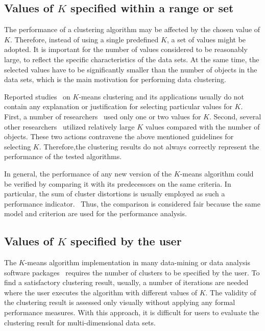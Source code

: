 \subsection{Values of $K$ specified within a range or set}
The  performance  of  a  clustering  algorithm  may  be
affected by the chosen value of $K$. Therefore, instead
of using a single predefined $K$, a set of values might
be   adopted.   It   is   important   for   the   number   of
values  considered  to  be  reasonably  large,  to  reflect
the  specific  characteristics  of  the  data  sets.  At  the
same  time,  the  selected  values  have  to  be  significantly
smaller  than  the  number  of  objects  in  the
data sets, which is the main motivation for performing data clustering.

Reported studies~\cite{han00, daoud95, daoud96, ranka98, bilmes97, bengio95}
on $K$-means clustering and
its  applications  usually  do  not  contain  any  explanation
or  justification  for  selecting  particular  values for $K$.
First,  a  number  of  researchers~\cite{bilmes97, bengio95} used  only  one  or  two  values  for $K$.
Second, several  other  researchers~\cite{han00, daoud96} utilized relatively  large $K$
values  compared  with  the  number of  objects.  These  two  actions  contravene
the  above mentioned  guidelines  for  selecting $K$. Therefore,the
clustering  results  do  not  always  correctly  represent
the performance of the tested algorithms.

In  general,  the  performance  of  any  new  version
of the $K$-means algorithm could be verified by comparing  it  with  its  predecessors  on  the  same  criteria.
In   particular,   the   sum   of   cluster   distortions   is
usually  employed  as  such  a  performance  indicator.~\cite{daoud96, bengio95}
Thus, the comparison is considered fair  because  the  same  model and  criterion  are  used
for the performance analysis.

\subsection{Values of $K$ specified by the user}
The $K$-means  algorithm  implementation  in  many
data-mining   or   data   analysis   software   packages~\cite{hall02}
requires the number of clusters to be specified
by  the  user.  To  find  a  satisfactory  clustering
result,  usually,  a  number  of  iterations  are  needed
where the user executes the algorithm with different
values  of $K$.  The  validity  of  the  clustering  result  is
assessed  only  visually  without  applying  any  formal
performance   measures.   With   this   approach,   it   is
difficult  for  users  to  evaluate  the  clustering  result
for multi-dimensional data sets.

